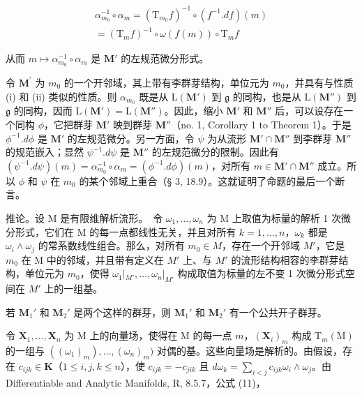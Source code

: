 \[
\begin{array}{r} \alpha_ {m _ {0}} ^ {- 1} \circ \alpha_ {m} = (\mathrm{T} _ {m _ {0}} f) ^ {- 1} \circ (f ^ {- 1}. d f) (m) \\ = (\mathrm{T} _ {m} f) ^ {- 1} \circ \omega (f (m)) \circ \mathrm{T} _ {m} f \end{array}
\]

从而 \(m \mapsto \alpha_{m_0}^{-1} \circ \alpha_m\) 是 \(\mathbf{M}'\) 的左规范微分形式。

令 \(\mathbf{M}^{\prime}\) 为 \(m_0\) 的一个开邻域，其上带有李群芽结构，单位元为 \(m_0\)，并具有与性质 (i) 和 (ii) 类似的性质。则 \(\alpha_{m_0}\) 既是从 \(\mathrm{L}(\mathbf{M}')\) 到 \(\mathfrak{g}\) 的同构，也是从 \(\mathrm{L}(\mathbf{M}'')\) 到 \(\mathfrak{g}\) 的同构，因而 \(\mathrm{L}(\mathbf{M}') = \mathrm{L}(\mathbf{M}'')\)。因此，缩小 \(\mathbf{M}'\) 和 \(\mathbf{M}''\) 后，可以设存在一个同构 \(\phi\)，它把群芽 \(\mathbf{M}'\) 映到群芽 \(\mathbf{M}''\)（no. 1, Corollary 1 to Theorem 1）。于是 \(\phi^{-1}.d\phi\) 是 \(\mathbf{M}'\) 的左规范微分。另一方面，令 \(\psi\) 为从流形 \(\mathbf{M}' \cap \mathbf{M}''\) 到李群芽 \(\mathbf{M}''\) 的规范嵌入；显然 \(\psi^{-1}.d\psi\) 是 \(\mathbf{M}''\) 的左规范微分的限制。因此有 \((\psi^{-1}.d\psi)(m) = \alpha_{m_0}^{-1} \circ \alpha_m = (\phi^{-1}.d\phi)(m)\)，对所有 \(m \in \mathbf{M}' \cap \mathbf{M}''\) 成立。所以 \(\phi\) 和 \(\psi\) 在 \(m_0\) 的某个邻域上重合（§ 3, 18.9）。这就证明了命题的最后一个断言。

推论。设 M 是有限维解析流形。~令 \(\omega_{1},\ldots,\omega_{n}\) 为 M 上取值为标量的解析 1 次微分形式，它们在 M 的每一点都线性无关，并且对所有 \(k=1,\ldots,n\)，\(\omega_{k}\) 都是 \(\omega_{i}\wedge\omega_{j}\) 的常系数线性组合。那么，对所有 \(m_{0}\in M\)，存在一个开邻域 \(M'\)，它是 \(m_{0}\) 在 M 中的邻域，并且带有定义在 \(M'\) 上、与 \(M'\) 的流形结构相容的李群芽结构，单位元为 \(m_{0}\)，使得 \(\omega_{1}|_{M'},\ldots,\omega_{n}|_{M'}\) 构成取值为标量的左不变 1 次微分形式空间在 \(M'\) 上的一组基。

若 \(\mathbf{M}_1'\) 和 \(\mathbf{M}_2'\) 是两个这样的群芽，则 \(\mathbf{M}_1'\) 和 \(\mathbf{M}_2'\) 有一个公共开子群芽。

令 \(\mathbf{X}_1, \ldots, \mathbf{X}_n\) 为 M 上的向量场，使得在 M 的每一点 \(m\)，\((\mathbf{X}_i)_m\) 构成 \(\mathrm{T}_m(\mathrm{M})\) 的一组与 \(((\omega_1)_m), \ldots, (\omega_n)_m)\) 对偶的基。这些向量场是解析的。由假设，存在 \(c_{ijk} \in \mathbf{K}\)（\(1 \leqslant i,j, k \leqslant n\)），使 \(c_{ijk} = -c_{jik}\) 且 \(d\omega_k = \sum_{i < j} c_{ijk}\omega_i \wedge \omega_j\)。由 Differentiable and Analytic Manifolds, R, 8.5.7，公式 (11)，


